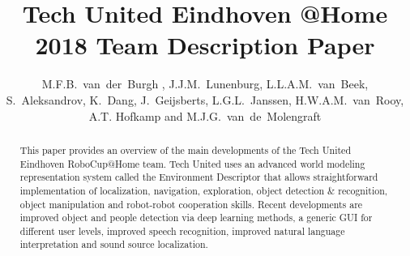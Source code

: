 \documentclass[runningheads,a4paper]{llncs}
\begin{document}
\setlength{\headheight}{22pt}

\title{Tech United Eindhoven @Home \\2018 Team Description Paper}

\author{M.F.B.~van~der~Burgh , J.J.M.~Lunenburg, L.L.A.M.~van~Beek,
S.~Aleksandrov, K.~Dang, J.~Geijsberts, L.G.L.~Janssen,
H.W.A.M.~van~Rooy, A.T. Hofkamp and M.J.G.~van~de~Molengraft}




\maketitle
%
%
%
\begin{abstract}




This paper provides an overview of the main developments of the Tech United Eindhoven RoboCup@Home team. Tech United uses an advanced world modeling representation system called the Environment Descriptor that allows straightforward implementation of localization, navigation, exploration, object detection \& recognition, object manipulation and robot-robot cooperation skills. Recent developments are improved object and people detection via deep learning methods, a generic GUI for different user levels, improved speech recognition, improved natural language interpretation and sound source localization.

\end{abstract}
%
%
%
\end{document}
